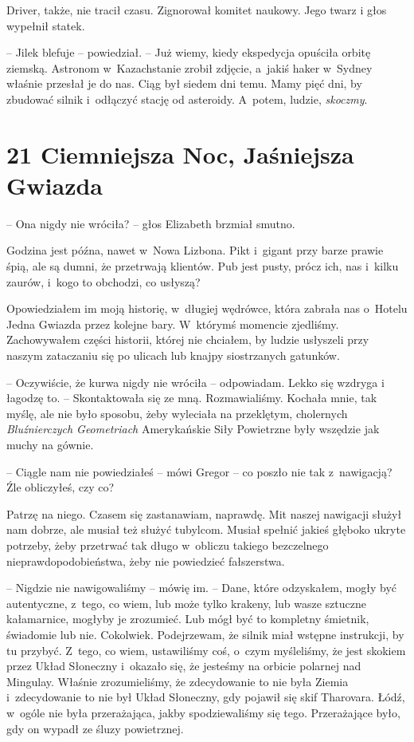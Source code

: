 \documentclass[oneside,polish,12pt,sfheadings]{mwbk}
\begin{document}
Driver, także, nie tracił czasu. Zignorował komitet naukowy. Jego twarz
i głos wypełnił statek.

-- Jilek blefuje -- powiedział. -- Już wiemy, kiedy ekspedycja opuściła
orbitę ziemską. Astronom w~Kazachstanie zrobił zdjęcie, a~jakiś haker w~Sydney właśnie przesłał je do nas. Ciąg był siedem dni temu. Mamy pięć
dni, by zbudować silnik i~odłączyć stację od asteroidy. A~potem, ludzie,
\emph{skoczmy}.



\chapter[Ciemniejsza Noc, Jaśniejsza Gwiazda]{21 Ciemniejsza Noc, Jaśniejsza Gwiazda}


-- Ona nigdy nie wróciła? -- głos Elizabeth brzmiał smutno.

Godzina jest późna, nawet w~Nowa Lizbona. Pikt i~gigant przy barze
prawie śpią, ale są dumni, że przetrwają klientów. Pub jest pusty, prócz
ich, nas i~kilku zaurów, i~kogo to obchodzi, co usłyszą?

Opowiedziałem im moją historię, w~długiej wędrówce, która zabrała nas o~Hotelu Jedna Gwiazda przez kolejne bary. W~którymś momencie zjedliśmy.
Zachowywałem części historii, której nie chciałem, by ludzie usłyszeli
przy naszym zataczaniu się po ulicach lub knajpy siostrzanych gatunków.

-- Oczywiście, że kurwa nigdy nie wróciła -- odpowiadam. Lekko się wzdryga
i łagodzę to. -- Skontaktowała się ze mną. Rozmawialiśmy. Kochała mnie,
tak myślę, ale nie było sposobu, żeby wyleciała na przeklętym,
cholernych \emph{Bluźnierczych Geometriach } Amerykańskie Siły
Powietrzne były wszędzie jak muchy na gównie.

-- Ciągle nam nie powiedziałeś -- mówi Gregor -- co poszło nie tak z~nawigacją? Źle obliczyłeś, czy co?

Patrzę na niego. Czasem się zastanawiam, naprawdę. Mit naszej nawigacji
służył nam dobrze, ale musiał też służyć tubylcom. Musiał spełnić jakieś
głęboko ukryte potrzeby, żeby przetrwać tak długo w~obliczu takiego
bezczelnego nieprawdopodobieństwa, żeby nie powiedzieć fałszerstwa.

-- Nigdzie nie nawigowaliśmy -- mówię im. -- Dane, które odzyskałem, mogły
być autentyczne, z~tego, co wiem, lub może tylko krakeny, lub wasze
sztuczne kałamarnice, mogłyby je zrozumieć. Lub mógł być to kompletny
śmietnik, świadomie lub nie. Cokolwiek. Podejrzewam, że silnik miał
wstępne instrukcji, by tu przybyć. Z~tego, co wiem, ustawiliśmy coś, o~czym myśleliśmy, że jest skokiem przez Układ Słoneczny i~okazało się, że
jesteśmy na orbicie polarnej nad Mingulay. Właśnie zrozumieliśmy, że
zdecydowanie to nie była Ziemia i~zdecydowanie to nie był Układ
Słoneczny, gdy pojawił się skif Tharovara. Łódź, w~ogóle nie była
przerażająca, jakby spodziewaliśmy się tego. Przerażające było, gdy on
wypadł ze śluzy powietrznej.
\end{document}
